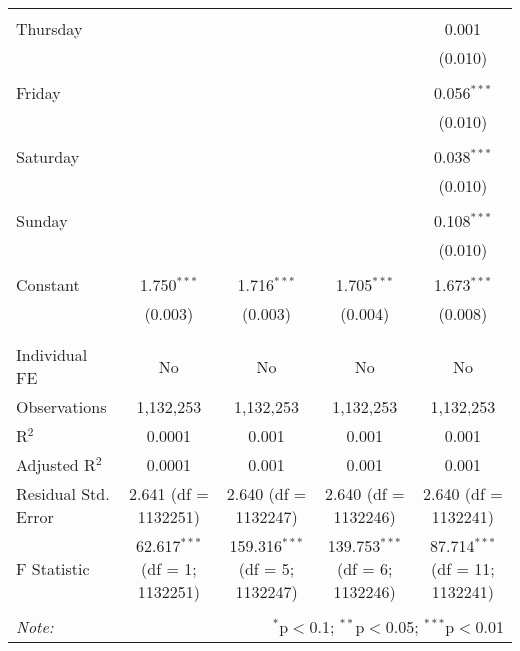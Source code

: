 \documentclass[
]{article}
\begin{document}
\begin{table}[!htbp]
{\begin{tabular}{@{\extracolsep{5pt}}lcccc}
  & & & & \\ 
 Thursday &  &  &  & 0.001 \\ 
  &  &  &  & (0.010) \\ 
  & & & & \\ 
 Friday &  &  &  & 0.056$^{***}$ \\ 
  &  &  &  & (0.010) \\ 
  & & & & \\ 
 Saturday &  &  &  & 0.038$^{***}$ \\ 
  &  &  &  & (0.010) \\ 
  & & & & \\ 
 Sunday &  &  &  & 0.108$^{***}$ \\ 
  &  &  &  & (0.010) \\ 
  & & & & \\ 
 Constant & 1.750$^{***}$ & 1.716$^{***}$ & 1.705$^{***}$ & 1.673$^{***}$ \\ 
  & (0.003) & (0.003) & (0.004) & (0.008) \\ 
  & & & & \\ 
\hline \\[-1.8ex] 
Individual FE & No & No & No & No \\ 
Observations & 1,132,253 & 1,132,253 & 1,132,253 & 1,132,253 \\ 
R$^{2}$ & 0.0001 & 0.001 & 0.001 & 0.001 \\ 
Adjusted R$^{2}$ & 0.0001 & 0.001 & 0.001 & 0.001 \\ 
Residual Std. Error & 2.641 (df = 1132251) & 2.640 (df = 1132247) & 2.640 (df = 1132246) & 2.640 (df = 1132241) \\ 
F Statistic & 62.617$^{***}$ (df = 1; 1132251) & 159.316$^{***}$ (df = 5; 1132247) & 139.753$^{***}$ (df = 6; 1132246) & 87.714$^{***}$ (df = 11; 1132241) \\ 
\hline 
\hline \\[-1.8ex] 
\textit{Note:}  & \multicolumn{4}{r}{$^{*}$p$<$0.1; $^{**}$p$<$0.05; $^{***}$p$<$0.01} \\ 
\end{tabular}
} 
\end{table} 
\newpage
\end{document}
